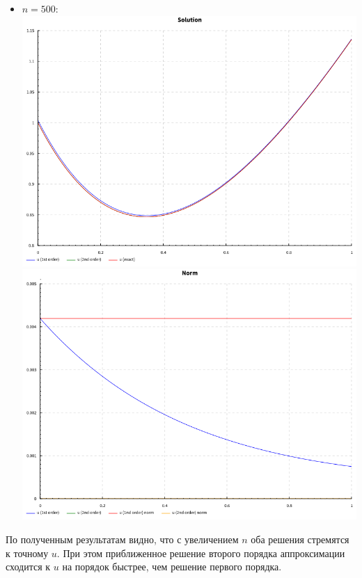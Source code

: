 \documentclass[a4paper,12pt]{article}
\begin{document}
\begin{flushleft}
\begin{itemize}
    \item $n=500$:\linebreak
      \includegraphics[scale=0.6]{solution_500.png}\linebreak
      \includegraphics[scale=0.6]{norm_500.png}\linebreak
  \end{itemize}
\end{flushleft}
\begin{flushleft}
  По полученным результатам видно, что с увеличением $n$ оба решения стремятся к точному $u$. При этом приближенное решение второго порядка аппроксимации сходится к $u$ на порядок быстрее, чем решение первого порядка.
\end{flushleft}
\end{document}
